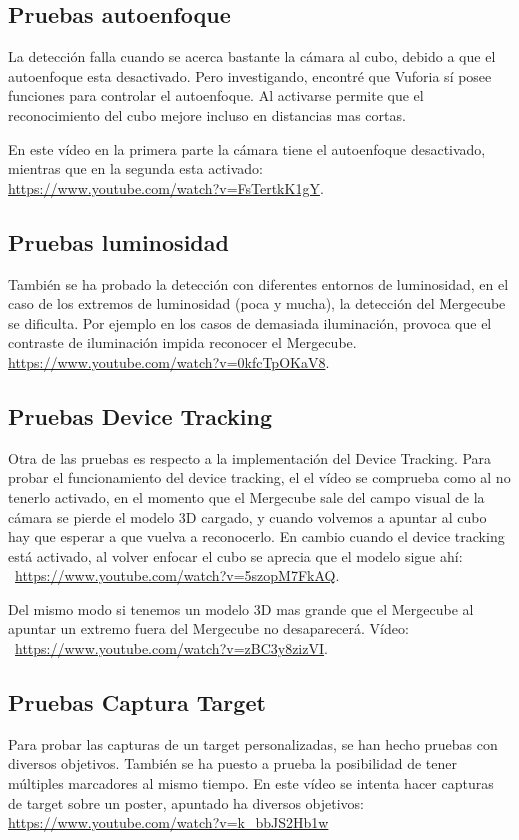 \subsection{Pruebas autoenfoque}
La detección falla cuando se acerca bastante la cámara al cubo, debido a que el autoenfoque esta desactivado. Pero investigando, encontré que Vuforia sí posee funciones para controlar el autoenfoque. Al activarse permite que el reconocimiento del cubo mejore incluso en distancias mas cortas.

En este vídeo en la primera parte la cámara tiene el autoenfoque desactivado, mientras que en la segunda esta activado:\\ \url{https://www.youtube.com/watch?v=FsTertkK1gY}.



\subsection{Pruebas luminosidad}
También se ha probado la detección con diferentes entornos de luminosidad, en el caso de los extremos de luminosidad (poca y mucha), la detección del Mergecube se dificulta. Por ejemplo en los casos de demasiada iluminación, provoca que el contraste de iluminación impida reconocer el Mergecube. 
\url{https://www.youtube.com/watch?v=0kfcTpOKaV8}.

\subsection{Pruebas Device Tracking}
Otra de las pruebas es respecto a la implementación del Device Tracking. Para probar el funcionamiento del device tracking, el el vídeo se comprueba como al no tenerlo activado, en el momento que el Mergecube sale del campo visual de la cámara se pierde el modelo 3D cargado, y cuando volvemos a apuntar al cubo hay que esperar a que vuelva a reconocerlo. En cambio cuando el device tracking está activado, al volver enfocar el cubo se aprecia que el modelo sigue ahí:\\~\url{https://www.youtube.com/watch?v=5szopM7FkAQ}.

Del mismo modo si tenemos un modelo 3D mas grande que el Mergecube al apuntar un extremo fuera del Mergecube no desaparecerá. Vídeo:\\~\url{https://www.youtube.com/watch?v=zBC3y8zizVI}.

\subsection{Pruebas Captura Target}
Para probar las capturas de un target personalizadas, se han hecho pruebas con diversos objetivos. También se ha puesto a prueba la posibilidad de tener múltiples marcadores al mismo tiempo. En este vídeo se intenta hacer capturas de target sobre un poster, apuntado ha diversos objetivos: \url{https://www.youtube.com/watch?v=k_bbJS2Hb1w}	


